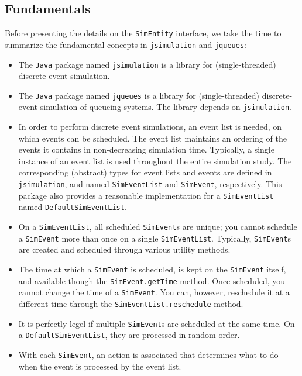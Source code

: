 \subsection{Fundamentals}

Before presenting the details on the \lstinline|SimEntity| interface,
we take the time to summarize the fundamental concepts in
\lstinline|jsimulation| and \lstinline|jqueues|:
\begin{itemize}
	\item The \lstinline|Java| package named \lstinline|jsimulation|
	is a library for (single-threaded) discrete-event simulation.
	\item The \lstinline|Java| package named \lstinline|jqueues|
	is a library for (single-threaded) discrete-event simulation
	of queueing systems.
	The library depends on \lstinline|jsimulation|.
	\item In order to perform discrete event simulations,
	an event list is needed, on which events can be scheduled.
	The event list maintains an ordering of the events it contains
	in non-decreasing simulation time.
	Typically, a single instance of an event list is used
	throughout the entire simulation study.
	The corresponding (abstract) types
	for event lists and events are defined in \lstinline|jsimulation|,
	and named \lstinline|SimEventList| and \lstinline|SimEvent|, respectively.
	This package also provides a reasonable implementation for
	a \lstinline|SimEventList| named \lstinline|DefaultSimEventList|.
	\item On a \lstinline|SimEventList|, all scheduled \lstinline|SimEvent|s are
	unique; you cannot schedule a \lstinline|SimEvent| more than once
	on a single \lstinline|SimEventList|.
	Typically, \lstinline|SimEvent|s are created and scheduled through
	various utility methods.
	\item The time at which a \lstinline|SimEvent| is scheduled,
	is kept on the \lstinline|SimEvent| itself,
	and available though the \lstinline|SimEvent.getTime| method.
	Once scheduled, you cannot change the time of a \lstinline|SimEvent|.
	You can, however, reschedule it at a different time
	through the \lstinline|SimEventList.reschedule| method.
	\item It is perfectly legel if multiple \lstinline|SimEvent|s are scheduled
	at the same time.
	On a \lstinline|DefaultSimEventList|, they are processed in random order.
	\item With each \lstinline|SimEvent|, an action is associated that determines
	what to do when the event is processed by the event list.

\end{itemize}
